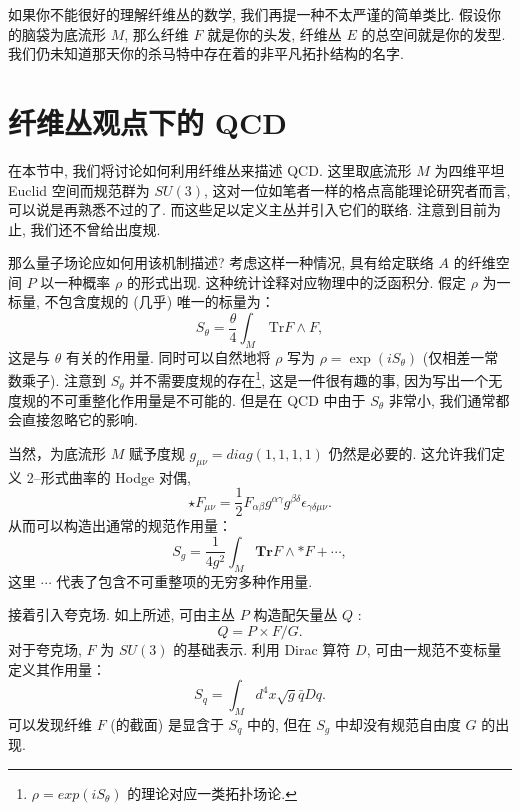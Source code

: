 \documentclass{article}
\begin{document}
\par 如果你不能很好的理解纤维丛的数学, 我们再提一种不太严谨的简单类比. 假设你的脑袋为底流形 $M$, 那么纤维 $F$ 就是你的头发, 纤维丛 $E$ 的总空间就是你的发型. 我们仍未知道那天你的杀马特中存在着的非平凡拓扑结构的名字.
\section{纤维丛观点下的 QCD}
在本节中, 我们将讨论如何利用纤维丛来描述 QCD. 这里取底流形 $M$ 为四维平坦 Euclid 空间而规范群为 $SU(3)$, 这对一位如笔者一样的格点高能理论研究者而言, 可以说是再熟悉不过的了. 而这些足以定义主丛并引入它们的联络. 注意到目前为止, 我们还不曾给出度规.

\par 那么量子场论应如何用该机制描述? 考虑这样一种情况, 具有给定联络 $A$ 的纤维空间 $P$ 以一种概率 $\rho$ 的形式出现. 这种统计诠释对应物理中的泛函积分. 假定 $\rho$ 为一标量, 不包含度规的 (几乎) 唯一的标量为：
\begin{equation}
S_{\theta}=\frac{\theta}{4}\int_{M}\,\textrm{Tr}F\wedge F,
\end{equation}
这是与 $\theta$ 有关的作用量. 同时可以自然地将 $\rho$ 写为 $\rho=\exp(iS_{\theta})$ (仅相差一常数乘子). 注意到
 $S_{\theta}$ 并不需要度规的存在\footnote{$\rho=exp(iS_{\theta})$ 的理论对应一类拓扑场论.}, 这是一件很有趣的事,
 因为写出一个无度规的不可重整化作用量是不可能的. 但是在 QCD 中由于 $S_{\theta}$ 非常小, 我们通常都会直接忽略它的影响.
\par 当然，为底流形 $M$ 赋予度规 $g_{\mu\nu}= diag(1,1,1,1)$ 仍然是必要的. 这允许我们定义 2--形式曲率的 Hodge 对偶,
\begin{equation}
\star F_{\mu\nu}=\frac{1}{2}F_{\alpha\beta}g^{\alpha\gamma}g^{\beta\delta}\epsilon_{\gamma\delta\mu\nu}.
\end{equation}
从而可以构造出通常的规范作用量：
\begin{equation}
S_{g}=\frac{1}{4g^{2}}\int_{M}\textbf{Tr}F\wedge *F+ \cdots,
\end{equation}
这里 $\cdots$ 代表了包含不可重整项的无穷多种作用量.
\par 接着引入夸克场. 如上所述, 可由主丛 $P$ 构造配矢量丛 $Q$ :
\begin{equation}
Q=P\times F/G.
\end{equation}
对于夸克场, $F$ 为 $SU(3)$ 的基础表示. 利用 Dirac 算符 $D$, 可由一规范不变标量定义其作用量：
\begin{equation}
S_{q}=\int_{M}d^{4}x\sqrt{g}\bar{q}Dq.
\end{equation}
可以发现纤维 $F$ (的截面) 是显含于 $S_{q}$ 中的, 但在 $S_{g}$ 中却没有规范自由度 $G$ 的出现.
\end{document}
